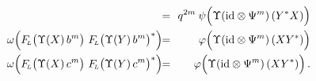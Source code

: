 \begin{lemma_sec}
\begin{eqnarray}
\!\!&=&\!\!
   q^{2m} \: \psi \! \left(\Upsilon \!\left(\id \tens \Psi^m \right)(Y^* X) \vertL\right)
\label{eq:pre_plancherel:essence:Rc}
\\
    \omega\! \left(\vertL   \FLabb\! \left(\Upsilon(X)\, b^m \vertM\right) \,
                           \FLabb\! \left(\Upsilon(Y)\, b^m \vertM\right)^*   \right)
\!\!&=&\!\!
    \varphi \!\left(\Upsilon \!\left(\id \tens \Psi^m \right)(X Y^*) \vertL\right)
\label{eq:pre_plancherel:essence:Lb}
\\
    \omega \! \left(\vertL   \FLabb\! \left(\Upsilon(X)\, c^m \vertM\right) \,
                           \FLabb\! \left(\Upsilon(Y)\, c^m \vertM\right)^*   \right)
\!\!&=&\!\!
    \varphi \!\left(\Upsilon \!\left(\id \tens \Psi^m \right)(X Y^*)  \vertL\right).
\label{eq:pre_plancherel:essence:Lc}
\end{eqnarray}
\end{lemma_sec}


